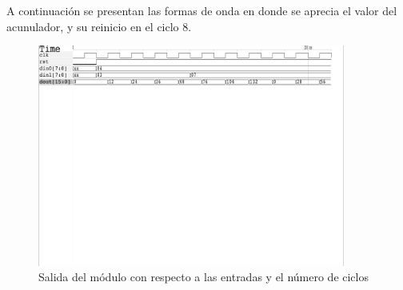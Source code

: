 \documentclass[letterpaper, 12pt]{article}
\numberwithin{equation}{section}
\begin{document}
A continuación se presentan las formas de onda en donde se aprecia el valor del acunulador, y su reinicio en el ciclo 8.

\begin{figure}[H]
  \centering
  \includegraphics[width=0.9\textwidth]{../testbench/mac8/waves_mac8.pdf}
  \caption{Salida del módulo con respecto a las entradas y el número de ciclos}
\end{figure}
\end{document}
